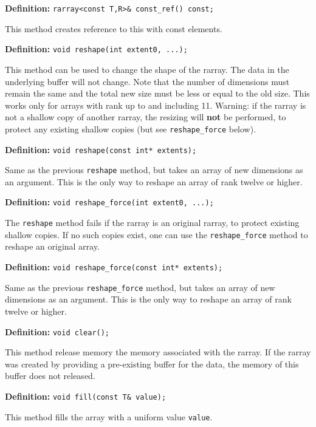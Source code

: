 \documentclass[11pt,twoside]{article}
\begin{document}

\noindent\textbf{Definition:} \texttt{rarray{\tt<}const T,R{\tt>}\& const\_ref() const;}

This method creates reference to this with const elements.

\noindent\textbf{Definition:} \texttt{void reshape(int extent0, ...);}

This method can be used to change the shape of the rarray. The data in the underlying buffer will not change. Note that the number of dimensions must remain the same and the total new size must be less or equal to the old size.  This works only for arrays with rank up to and including 11.  Warning: if the rarray is not a shallow copy of another rarray, the resizing will \textbf{not} be performed, to protect any existing shallow copies (but see \texttt{reshape\_force} below).

\noindent\textbf{Definition:} \texttt{void reshape(const int* extents);}

Same as the previous \texttt{reshape} method, but takes an array of new dimensions as an argument.  This is the only way to reshape an array of rank twelve or higher.

\noindent\textbf{Definition:} \texttt{void reshape\_force(int extent0, ...);}

The \texttt{reshape} method fails if the rarray is an original rarray, to protect existing shallow copies. If no such copies exist, one can use the \texttt{reshape\_force} method to reshape an original array.

\noindent\textbf{Definition:} \texttt{void reshape\_force(const int* extents);}

Same as the previous \texttt{reshape\_force} method, but takes an array of new dimensions as an argument.  This is the only way to reshape an array of rank twelve or higher.

\noindent\textbf{Definition:} \texttt{void clear();}

This method release memory the memory associated with the rarray. If the rarray was created by providing a pre-existing buffer for the data, the memory of this buffer does not released.

\noindent\textbf{Definition:} \texttt{void fill(const T\& value);}

This method fills the array with a uniform value \texttt{value}.
\end{document}

